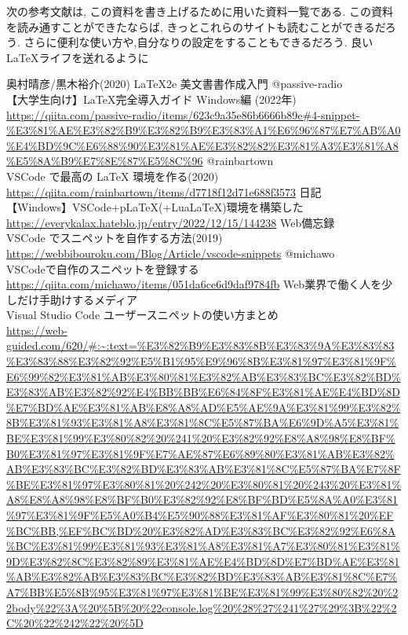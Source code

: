 \documentclass{ltjsarticle}
\begin{document}
次の参考文献は,
この資料を書き上げるために用いた資料一覧である.
この資料を読み通すことができたならば,
きっとこれらのサイトも読むことができるだろう.
さらに便利な使い方や,自分なりの設定をすることもできるだろう.
良い\LaTeX ライフを送れるように
\begin{thebibliography}{999}
  奥村晴彦/黒木裕介(2020)
  \LaTeX 2e 美文書書作成入門
  @passive-radio\\
  【大学生向け】LaTeX完全導入ガイド Windows編 (2022年)\\
  \url{https://qiita.com/passive-radio/items/623c9a35e86b6666b89e#4-snippet-%E3%81%AE%E3%82%B9%E3%82%B9%E3%83%A1%E6%96%87%E7%AB%A0%E4%BD%9C%E6%88%90%E3%81%AE%E3%82%82%E3%81%A3%E3%81%A8%E5%8A%B9%E7%8E%87%E5%8C%96}
  @rainbartown\\
  VSCode で最高の LaTeX 環境を作る(2020)
  \url{https://qiita.com/rainbartown/items/d7718f12d71e688f3573}
  日記\\
  【Windows】VSCode+pLaTeX(+LuaLaTeX)環境を構築した\\
  \url{https://everykalax.hateblo.jp/entry/2022/12/15/144238}
  Web備忘録\\
  VSCode でスニペットを自作する方法(2019)\\
  \url{https://webbibouroku.com/Blog/Article/vscode-snippets}
  @michawo\\
  VSCodeで自作のスニペットを登録する\\
  \url{https://qiita.com/michawo/items/051da6ce6d9daf9784fb}
  Web業界で働く人を少しだけ手助けするメディア\\
  Visual Studio Code ユーザースニペットの使い方まとめ\\
  \url{https://web-guided.com/620/#:~:text=%E3%82%B9%E3%83%8B%E3%83%9A%E3%83%83%E3%83%88%E3%82%92%E5%B1%95%E9%96%8B%E3%81%97%E3%81%9F%E6%99%82%E3%81%AB%E3%80%81%E3%82%AB%E3%83%BC%E3%82%BD%E3%83%AB%E3%82%92%E4%BB%BB%E6%84%8F%E3%81%AE%E4%BD%8D%E7%BD%AE%E3%81%AB%E8%A8%AD%E5%AE%9A%E3%81%99%E3%82%8B%E3%81%93%E3%81%A8%E3%81%8C%E5%87%BA%E6%9D%A5%E3%81%BE%E3%81%99%E3%80%82%20%241%20%E3%82%92%E8%A8%98%E8%BF%B0%E3%81%97%E3%81%9F%E7%AE%87%E6%89%80%E3%81%AB%E3%82%AB%E3%83%BC%E3%82%BD%E3%83%AB%E3%81%8C%E5%87%BA%E7%8F%BE%E3%81%97%E3%80%81%20%242%20%E3%80%81%20%243%20%E3%81%A8%E8%A8%98%E8%BF%B0%E3%82%92%E8%BF%BD%E5%8A%A0%E3%81%97%E3%81%9F%E5%A0%B4%E5%90%88%E3%81%AF%E3%80%81%20%EF%BC%BB,%EF%BC%BD%20%E3%82%AD%E3%83%BC%E3%82%92%E6%8A%BC%E3%81%99%E3%81%93%E3%81%A8%E3%81%A7%E3%80%81%E3%81%9D%E3%82%8C%E3%82%89%E3%81%AE%E4%BD%8D%E7%BD%AE%E3%81%AB%E3%82%AB%E3%83%BC%E3%82%BD%E3%83%AB%E3%81%8C%E7%A7%BB%E5%8B%95%E3%81%97%E3%81%BE%E3%81%99%E3%80%82%20%22body%22%3A%20%5B%20%22console.log%20%28%27%241%27%29%3B%22%2C%20%22%242%22%20%5D}

\end{thebibliography}
\end{document}
